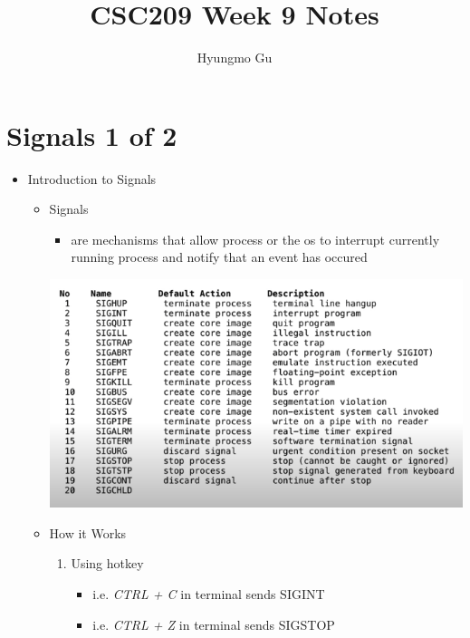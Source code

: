 \documentclass[12pt]{article}
\begin{document}
\title{CSC209 Week 9 Notes}
\author{Hyungmo Gu}
\maketitle

\section*{Signals 1 of 2}

\bigskip

\begin{itemize}
    \item Introduction to Signals
    \begin{itemize}
        \item Signals
        \begin{itemize}
            \item are mechanisms that allow process or the os to interrupt
        currently running process and notify that an event has occured
        \end{itemize}

        \begin{center}
        \includegraphics[width=\linewidth]{images/week_9_notes_1_1.png}
        \end{center}

        \item How it Works

        \begin{enumerate}[1.]
            \item Using hotkey
            \begin{itemize}
                \item i.e. \textit{CTRL + C} in terminal sends SIGINT
                \item i.e. \textit{CTRL + Z} in terminal sends SIGSTOP
            \end{itemize}


\end{enumerate}
\end{itemize}
\end{itemize}
\end{document}
